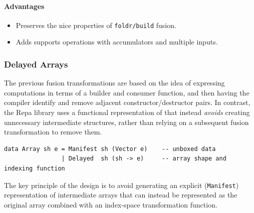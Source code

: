 \paragraph{Advantages}
\begin{itemize}
    \item Preserves the nice properties of \texttt{foldr/build} fusion.
    \item Adds supports operations with accumulators and multiple inputs.
\end{itemize}

%


\subsubsection{Delayed Arrays}

The previous fusion transformations are based on the idea of expressing
computations in terms of a builder and consumer function, and then having the
compiler identify and remove adjacent constructor/destructor pairs. In contrast,
the Repa \cite{Keller:2010} library uses a functional representation of
 that instead \emph{avoids} creating unnecessary
intermediate structures, rather than relying on a subsequent fusion
transformation to remove them.

\begin{lstlisting}[style=Haskell,numbers=none,caption={Repa-1 style array definition},label={lst:repa_arrays}]
data Array sh e = Manifest sh (Vector e)    -- unboxed data
                | Delayed  sh (sh -> e)     -- array shape and indexing function
\end{lstlisting}

The key principle of the design is to avoid generating an explicit
(\texttt{Manifest}) representation of intermediate arrays that can instead be
represented as the original array combined with an index-space transformation
function.



